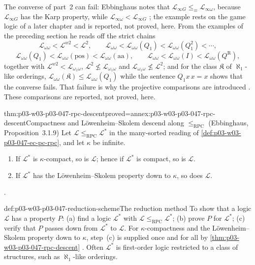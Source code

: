 The converse of part~2 can fail: Ebbinghaus notes that
\(\mathscr L_{\infty G}\le_{\equiv}\mathscr L_{\infty\omega}\), because
\(\mathscr L_{\infty G}\) has the Karp property, while
\(\mathscr L_{\infty\omega}<\mathscr L_{\infty G}\)
\cite[Ch.~II, \S3.1, p.~43]{Ebbinghaus1985ExtendedLogics}; the example rests
on the game logic of a later chapter and is reported, not proved, here.
From the examples of the preceding section he reads off the strict chains
\[
 \mathscr L_{\omega\omega}<\mathscr L^{w2}<\mathscr L^2,\qquad
 \mathscr L_{\omega\omega}<\mathscr L_{\omega\omega}(Q_1)<\mathscr L_{\omega\omega}(Q_1^2)<\cdots,
\]
\[
 \mathscr L_{\omega\omega}(Q_1)<\mathscr L_{\omega\omega}(\mathrm{pos})<\mathscr L_{\omega\omega}(\mathrm{aa}),\qquad
 \mathscr L_{\omega\omega}<\mathscr L_{\omega\omega}(I)<\mathscr L_{\omega\omega}(Q^{\mathrm R}),
\]
together with \(\mathscr L^{w2}<\mathscr L_{\omega_1\omega}\),
\(\mathscr L^2\not\le\mathscr L_{\omega_1\omega}\) and
\(\mathscr L_{\omega_1\omega}\not\le\mathscr L^2\); and for the class
\(\mathfrak K\) of \(\aleph_1\)-like orderings,
\(\mathscr L_{\omega\omega}(\mathfrak K)\le\mathscr L_{\omega\omega}(Q_1)\)
while the sentence \(Q_1x\,x=x\) shows that the converse fails.  That
failure is why the projective comparisons are introduced
\cite[Ch.~II, \S3.1, p.~43]{Ebbinghaus1985ExtendedLogics}.  These
comparisons are reported, not proved, here.

\begin{hbtheorem}{thm:p03-w03-p03-047-rpc-descent}{proved=annex:p03-w03-p03-047-rpc-descent}{Compactness and L\"owenheim--Skolem descend along \(\le_{\mathrm{RPC}}\) (Ebbinghaus, Proposition~3.1.9)}
Let \(\mathscr L\le_{\mathrm{RPC}}\mathscr L^*\) in the many-sorted reading
of \cref{def:p03-w03-p03-047-ec-pc-rpc}, and let \(\kappa\) be infinite.
\begin{enumerate}
 \item If \(\mathscr L^*\) is \(\kappa\)-compact, so is \(\mathscr L\);
       hence if \(\mathscr L^*\) is compact, so is \(\mathscr L\).
 \item If \(\mathscr L^*\) has the L\"owenheim--Skolem property down to
       \(\kappa\), so does \(\mathscr L\).
\end{enumerate}
\cite[Ch.~II, Proposition~3.1.9, p.~44]{Ebbinghaus1985ExtendedLogics}.
\end{hbtheorem}

\begin{hbmethod}{def:p03-w03-p03-047-reduction-scheme}{The reduction method}
To show that a logic \(\mathscr L\) has a property \(P\): (a) find a logic
\(\mathscr L^*\) with \(\mathscr L\le_{\mathrm{RPC}}\mathscr L^*\); (b) prove
\(P\) for \(\mathscr L^*\); (c) verify that \(P\) passes down from
\(\mathscr L^*\) to \(\mathscr L\).  For \(\kappa\)-compactness and the
L\"owenheim--Skolem property down to \(\kappa\), step~(c) is supplied once
and for all by \cref{thm:p03-w03-p03-047-rpc-descent}
\cite[Ch.~II, \S3.1, pp.~44--45]{Ebbinghaus1985ExtendedLogics}.  Often
\(\mathscr L^*\) is first-order logic restricted to a class of structures,
such as \(\aleph_1\)-like orderings.
\end{hbmethod}

